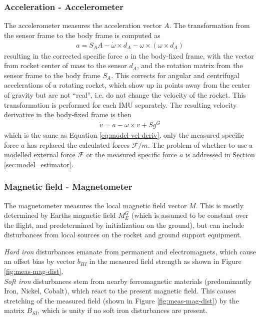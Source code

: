 \subsubsection{Acceleration - Accelerometer}
The accelerometer measures the acceleration vector $A$.
The transformation from the sensor frame to the body frame is computed as \cite{stevens2015}
\begin{align}
    a = S_A A - \dot \omega \times d_A - \omega \times (\omega \times d_A)
    \label{eq:meas-accel}
\end{align}
resulting in the corrected specific force $a$ in the body-fixed frame, with the vector from rocket center of mass to the sensor $d_A$, and the rotation matrix from the sensor frame to the body frame $S_A$.
This corrects for angular and centrifugal accelerations of a rotating rocket, which show up in points away from the center of gravity but are not ``real'', i.e. do not change the velocity of the rocket. 
This transformation is performed for each IMU separately.
The resulting velocity derivative in the body-fixed frame is then \cite{zipfel2007, stevens2015}
\begin{align}
    \dot v = a - \omega \times v + S g^G
    \label{eq:meas-veldot}
\end{align}
which is the same as Equation \ref{eq:model-vel-deriv}, only the measured specific force $a$ has replaced the calculated forces $\mathcal{F}/m$.
The problem of whether to use a modelled external force $\mathcal{F}$ or the measured specific force $a$ is addressed in Section \ref{sec:model_estimator}.

\subsubsection{Magnetic field - Magnetometer}
The magnetometer measures the local magnetic field vector $M$.
This is mostly determined by Earths magnetic field $M_E^G$ (which is assumed to be constant over the flight, and predetermined by initialization on the ground), but can include disturbances from local sources on the rocket and ground support equipment.

\textit{Hard iron} disturbances emanate from permanent and electromagnets, which cause an offset bias by vector $b_{HI}$ in the measured field strength as shown in Figure \ref{fig:meas-mag-dist}. \\
\textit{Soft iron} disturbances stem from nearby ferromagnetic materials (predominantly Iron, Nickel, Cobalt), which react to the present magnetic field. 
This causes stretching of the measured field (shown in Figure \ref{fig:meas-mag-dist}) by the matrix $B_{SI}$, which is unity if no soft iron disturbances are present.

